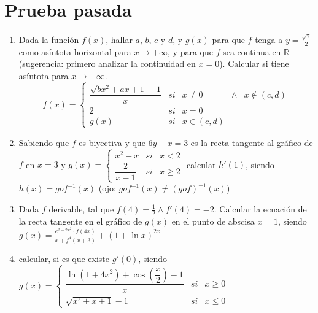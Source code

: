 \documentclass[12pt]{article}
\begin{document}

\section{Prueba pasada}

\begin{enumerate}
    \item Dada la función $f(x)$, hallar $a$, $b$, $c$ y $d$, y $g(x)$ para que $f$ tenga a $\displaystyle y=\frac{\sqrt{7}}{2}$ como asíntota horizontal para $x \to +\infty$, y para que $f$ sea continua en $\mathbb{R}$
(sugerencia: primero analizar la continuidad en $x=0$). Calcular si tiene asíntota para $x \to -\infty$.
\[
f(x)=\left\{
\begin{array}{ccrcc}
    \dfrac{\sqrt{bx^2+ax+1}-1}{x} & si & x\neq 0 & \wedge & x\not\in(c, d) \\[16pt]
    2 & si & x=0 \\[10pt]
    g(x) & si & x\in(c, d)
\end{array}
\right.
\]

\item Sabiendo que $f$ es biyectiva y que $6y-x=3$ es la recta tangente al gráfico de $f$ en $x=3$ y 
$\displaystyle g(x)=\left\{
\begin{array}{ccr}
     x^2-x & si & x<2 \\
     \dfrac{2}{x-1} & si & x \geq 2 
\end{array}\right.$ calcular $h'(1)$, siendo $h(x)=gof^{-1}(x)$ (ojo: $gof^{-1}(x) \neq (gof)^{-1}(x)$) 
\vspace{0.5cm}

\item Dada $f$ derivable, tal que $f(4)=\frac{1}{2} \wedge f'(4)=-2$. Calcular la ecuación de la recta tangente en el gráfico de $g(x)$ en el punto de abscisa $x=1$, siendo $\displaystyle g(x)=\frac{e^{2-2x^2} \cdot f(4x)}{x+f^4(x+3)}+\left(1+ \ln x \right)^{2x}$

\item calcular, si es que existe $g'(0)$, siendo $\displaystyle g(x)=\left\{\begin{array}{ccr}
    \dfrac{\ln \left(1+4x^2 \right) + \cos \left( \dfrac{x}{2}\right) - 1}{x} & si & x \geq 0 \\[16pt]
     \sqrt{x^2+x+1} - 1 & si & x \leq 0
\end{array}\right.$
\end{enumerate}


\newpage
\end{document}
